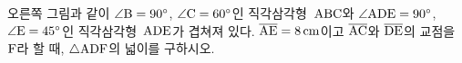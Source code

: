 \noindent\begin{minipage}[t]{0.58\linewidth}\vspace{0pt}\raggedright 오른쪽 그림과 같이 $\angle\mathrm{B}=90^\circ$, $\angle\mathrm{C}=60^\circ$인 직각삼각형~$\mathrm{ABC}$와 $\angle\mathrm{ADE}=90^\circ$, $\angle\mathrm{E}=45^\circ$인 직각삼각형~$\mathrm{ADE}$가 겹쳐져 있다. $\overline{\mathrm{AE}}=8\,\mathrm{cm}$이고 $\overline{\mathrm{AC}}$와 $\overline{\mathrm{DE}}$의 교점을 $\mathrm{F}$라 할 때, $\triangle\mathrm{ADF}$의 넓이를 구하시오. \end{minipage}\hfill\begin{minipage}[t]{0.4\linewidth}\vspace{0pt}\centering \resizebox{\ifdim\width>\linewidth\linewidth\else\width\fi}{!}{}\end{minipage}\par
